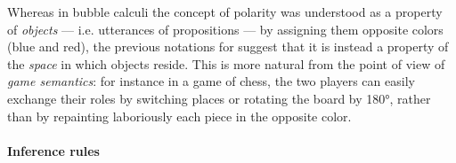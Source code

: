 \begin{remark}
  Whereas in bubble calculi the concept of polarity was understood as a property
  of \emph{objects} --- i.e. utterances of propositions --- by assigning them
  opposite colors (blue and red), the previous notations for  suggest that
  it is instead a property of the \emph{space} in which objects reside. This is
  more natural from the point of view of \emph{game semantics}: for instance in
  a game of chess, the two players can easily exchange their roles by switching
  places or rotating the board by 180°, rather than by repainting laboriously
  each piece in the opposite color.
\end{remark}

\paragraph{Inference rules}

